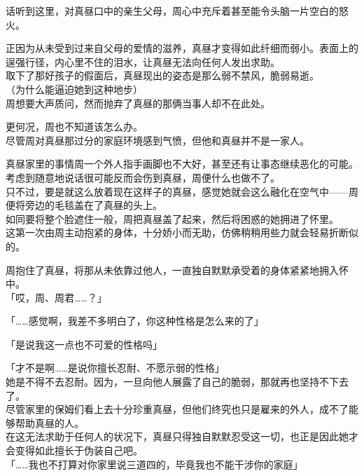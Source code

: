 话听到这里，对真昼口中的亲生父母，周心中充斥着甚至能令头脑一片空白的怒火。

正因为从未受到过来自父母的爱情的滋养，真昼才变得如此纤细而弱小。表面上的逞强行径，内心里不住的泪水，让真昼无法向任何人发出求助。\\

取下了那好孩子的假面后，真昼现出的姿态是那么弱不禁风，脆弱易逝。\\

（为什么能逼迫她到这种地步）\\

周想要大声质问，然而抛弃了真昼的那俩当事人却不在此处。

更何况，周也不知道该怎么办。\\

尽管周对真昼那过分的家庭环境感到气愤，但他和真昼并不是一家人。

真昼家里的事情周一个外人指手画脚也不大好，甚至还有让事态继续恶化的可能。考虑到随意地说话很可能反而会伤到真昼，周便什么也做不了。\\

只不过，要是就这么放着现在这样子的真昼，感觉她就会这么融化在空气中——周便将旁边的毛毯盖在了真昼的头上。\\

如同要将整个脸遮住一般，周把真昼盖了起来，然后将困惑的她拥进了怀里。\\

这第一次由周主动抱紧的身体，十分娇小而无助，仿佛稍稍用些力就会轻易折断似的。

周抱住了真昼，将那从未依靠过他人，一直独自默默承受着的身体紧紧地拥入怀中。\\

「哎，周、周君……？」

「……感觉啊，我差不多明白了，你这种性格是怎么来的了」

「是说我这一点也不可爱的性格吗」

「才不是啊……是说你擅长忍耐、不愿示弱的性格」\\

她是不得不去忍耐。因为，一旦向他人展露了自己的脆弱，那就再也坚持不下去了。\\

尽管家里的保姆们看上去十分珍重真昼，但他们终究也只是雇来的外人，成不了能够帮助真昼的人。\\

在这无法求助于任何人的状况下，真昼只得独自默默忍受这一切，也正是因此她才会变得如此擅长于伪装自己吧。\\

「……我也不打算对你家里说三道四的，毕竟我也不能干涉你的家庭」\\


